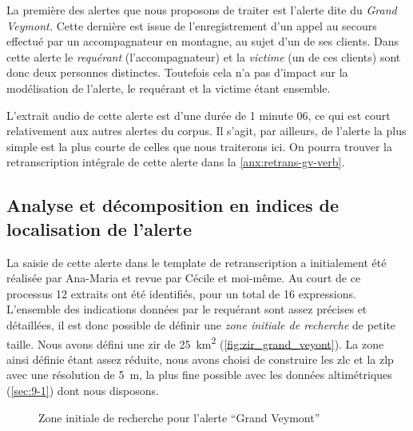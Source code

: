 La première des alertes que nous proposons de traiter est l'alerte
dite du \emph{Grand Veymont.} Cette dernière est issue de
l'enregistrement d'un appel au secours effectué par un accompagnateur
en montagne, au sujet d'un de ses clients. Dans cette alerte le
\emph{requérant} (\ie l'accompagnateur) et la \emph{victime} (\ie un
de ces clients) sont donc deux personnes distinctes. Toutefois cela
n'a pas d'impact sur la modélisation de l'alerte, le requérant et la
victime étant ensemble.

L'extrait audio de cette alerte est d'une durée de 1 minute 06, ce qui
est court relativement aux autres alertes du corpus. Il s'agit, par
ailleurs, de l'alerte la plus simple est la plus courte de celles que
nous traiterons ici. On pourra trouver la retranscription intégrale de
cette alerte dans la \autoref{anx:retrans-gv-verb}.

\subsection{Analyse et décomposition en indices de localisation de
  l'alerte}
\label{subsec:9-2-1}

La saisie de cette alerte dans le template de retranscription a
initialement été réalisée par Ana-Maria  et revue
par Cécile  et moi-même. Au court de ce processus 12
extraits ont été identifiés, pour un total de 16
expressions. L'ensemble des indications données par le requérant sont
assez précises et détaillées, il est donc possible de définir une
\emph{zone initiale de recherche} de petite taille. Nous avons défini
une \ac{zir} de \SI{25}{\kilo\meter\squared}
(\autoref{fig:zir_grand_veyont}). La zone ainsi définie étant assez
réduite, nous avons choisi de construire les \ac{zlc} et la \ac{zlp}
avec une résolution de \SI{5}{\meter}, la plus fine possible avec les
données altimétriques (\autoref{sec:9-1}) dont nous disposons.

\begin{figure}
  \centering
  
  \caption{Zone initiale de recherche pour l'alerte \enquote{Grand
      Veymont}}
  \label{fig:zir_grand_veyont}
\end{figure}

